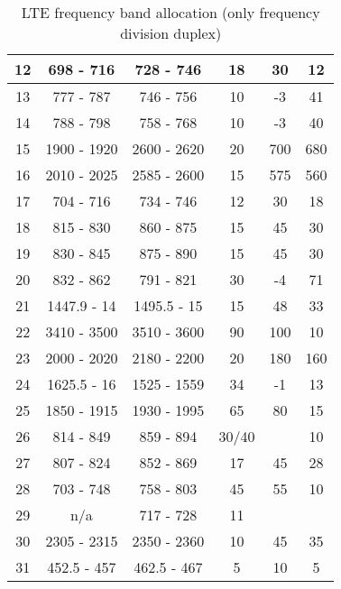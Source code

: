 \begin{table}[]
\begin{tabular}{|c|c|c|c|c|c|}
    12 & 698 - 716   & 728 - 746   & 18 & 30  & 12  \\ \hline
    13 & 777 - 787   & 746 - 756   & 10 & -3  & 41  \\ \hline
    14 & 788 - 798   & 758 - 768   & 10 & -3  & 40  \\ \hline
    15 & 1900 - 1920 & 2600 - 2620 & 20 & 700  & 680  \\ \hline
    16 & 2010 - 2025 & 2585 - 2600 & 15 & 575 & 560 \\ \hline
    17 & 704 - 716   & 734 - 746   & 12 & 30  & 18  \\ \hline
    18 & 815 - 830   & 860 - 875   & 15 & 45  & 30  \\ \hline
    19 & 830 - 845   & 875 - 890   & 15 & 45  & 30  \\ \hline
    20 & 832 - 862   & 791 - 821   & 30 & -4  & 71  \\ \hline
    21 & 1447.9 - 14 & 1495.5 - 15 & 15 & 48  & 33  \\ \hline
    22 & 3410 - 3500 & 3510 - 3600 & 90 & 100  & 10  \\ \hline
    23 & 2000 - 2020 & 2180 - 2200 & 20 & 180  & 160  \\ \hline
    24 & 1625.5 - 16 & 1525 - 1559 & 34 & -1  & 13  \\ \hline
    25 & 1850 - 1915 & 1930 - 1995 & 65 & 80  & 15  \\ \hline
    26 & 814 - 849   & 859 - 894   & 30/40 &     & 10  \\ \hline
    27 & 807 - 824   & 852 - 869   & 17 & 45  & 28  \\ \hline
    28 & 703 - 748   & 758 - 803   & 45 & 55  & 10  \\ \hline
    29 & n/a         & 717 - 728   & 11 &     &     \\ \hline
    30 & 2305 - 2315 & 2350 - 2360 & 10 & 45  & 35  \\ \hline
    31 & 452.5 - 457 & 462.5 - 467 & 5  & 10  & 5   \\ \hline
  \end{tabular}
  \caption{LTE frequency band allocation (only frequency division duplex) \cite{radio2015electronics}}
  \label{tab:ltefreqband}
\end{table}

